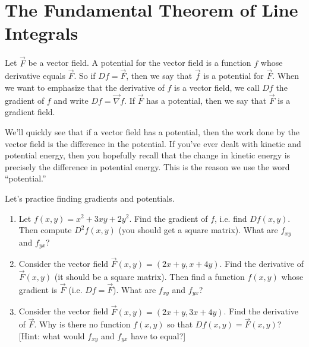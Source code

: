 \section{The Fundamental Theorem of Line Integrals}

\begin{definition}
%
 Let $\vec F$ be a vector field.  A potential for the vector field is a function $f$ whose derivative equals $\vec F$. So if $Df=\vec F$, then we say that $\vec f$ is a potential for $\vec F$. When we want to emphasize that the derivative of $f$ is a vector field, we call $Df$ the gradient of $f$ and write $Df = \vec \nabla f$.
 If $\vec F$ has a potential, then we say that $\vec F$ is a gradient field. 
\end{definition}

We'll quickly see that if a vector field has a potential, then the work done by the vector field is the difference in the potential.  If you've ever dealt with kinetic and potential energy, then you hopefully recall that the change in kinetic energy is precisely the difference in potential energy.  This is the reason we use the word ``potential.''

\begin{problem}
%
Let's practice finding gradients and potentials.
\begin{enumerate}
 \item  Let $f(x,y) = x^2+3xy+2y^2$. Find the gradient of $f$, i.e. find $Df(x,y)$. Then compute $D^2f(x,y)$ (you should get a square matrix). What are $f_{xy}$ and $f_{yx}$?
 \item Consider the vector field $\vec F(x,y)=(2x+y,x+4y)$. Find the derivative of $\vec F(x,y)$ (it should be a square matrix). Then find a function $f(x,y)$ whose gradient is $\vec F$ (i.e. $Df=\vec F$). What are $f_{xy}$ and $f_{yx}$?
 \item {}%
Consider the vector field $\vec F(x,y)=(2x+y,3x+4y)$.  Find the derivative of $\vec F$.  Why is there no function $f(x,y)$ so that $Df(x,y)=\vec F(x,y)$? [Hint: what would $f_{xy}$ and $f_{yx}$ have to equal?] 
\end{enumerate}
\end{problem}

